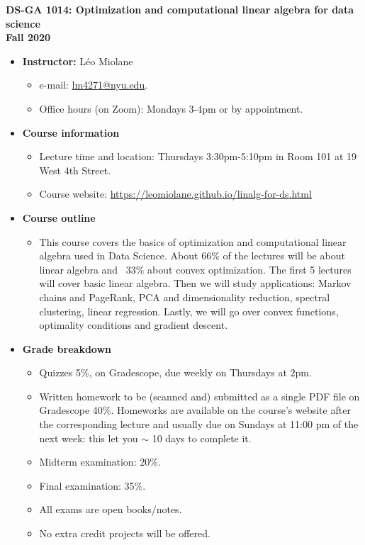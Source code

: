 \documentclass[11pt]{article}
\begin{document}
\begin{center}
	\textbf{\Large DS-GA 1014: Optimization and computational linear algebra for data science\\ \medskip Fall 2020}
\end{center}

\begin{itemize}
	\item \textbf{Instructor:} Léo Miolane
	\begin{itemize}
		\item e-mail: \url{lm4271@nyu.edu}. 
		\item Office hours (on Zoom): Mondays 3-4pm or by appointment.
	\end{itemize}
	
	\item \textbf{Course information}
	\begin{itemize}
		\item Lecture time and location: Thursdays 3:30pm-5:10pm in Room 101 at 19 West 4th Street.
	\item Course website: \url{https://leomiolane.github.io/linalg-for-ds.html}
	\end{itemize}
	
	\item \textbf{Course outline}
	\begin{itemize}
		\item This course covers the basics of optimization and computational linear algebra used in Data Science. About 66\% of the lectures will be about linear algebra and ~33\% about convex optimization. The first 5 lectures will cover basic linear algebra. Then we will study applications: Markov chains and PageRank, PCA and dimensionality reduction, spectral clustering, linear regression. Lastly, we will go over convex functions, optimality conditions and gradient descent.
	\end{itemize}
	
	\item \textbf{Grade breakdown}
	\begin{itemize}
		\item Quizzes 5\%, on Gradescope, due weekly on Thursdays at $2$pm.
		\item Written homework to be (scanned and) submitted as a single PDF file on Gradescope 40\%. Homeworks are available on the course's website after the corresponding lecture and usually due on Sundays at 11:00 pm of the next week: this let you $\sim$ 10 days to complete it.
		\item Midterm examination: 20\%. 
		\item Final examination: 35\%. 
		\item All exams are open books/notes.
		\item No extra credit projects will be offered.
	\end{itemize}
	

\end{itemize}
\end{document}
